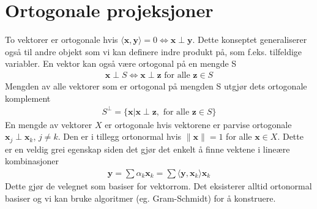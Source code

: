 \section{Ortogonale projeksjoner}
To vektorer er ortogonale hvis $\langle \mathbf{x},\mathbf{y} \rangle = 0 \iff \mathbf{x} \perp \mathbf{y}$. Dette konseptet generaliserer også til andre objekt som vi kan definere indre produkt på, som f.eks. tilfeldige variabler. En vektor kan også være ortogonal på en mengde S
\begin{align}
\mathbf{x} \perp S \iff \mathbf{x} \perp \mathbf{z} \text{ for alle } \mathbf{z} \in S
\end{align}
Mengden av alle vektorer som er ortogonal på mengden S utgjør dets ortogonale komplement
\begin{align}
S^\perp = \{\mathbf{x}|\mathbf{x}\perp \mathbf{z},\text{ for alle } \mathbf{z} \in S \}
\end{align}
En mengde av vektorer $X$ er ortogonale hvis vektorene er parvise ortogonale $\mathbf{x}_j \perp \mathbf{x}_k$, $j \neq k$. Den er i tillegg ortonormal hvis $\|\mathbf{x}\| = 1$ for alle $\mathbf{x} \in X$. Dette er en veldig grei egenskap siden det gjør det enkelt å finne vektene i lineære kombinasjoner
\begin{align}
\mathbf{y}=\sum \alpha_k \mathbf{x}_k = \sum \langle \mathbf{y}, \mathbf{x}_k \rangle \mathbf{x}_k
\end{align}
Dette gjør de velegnet som basiser for vektorrom. Det eksisterer alltid ortonormal basiser og vi kan bruke algoritmer (eg. Gram-Schmidt) for å konstruere.

